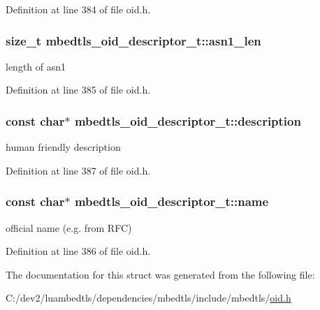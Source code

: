 Definition at line 384 of file oid.\-h.

\hypertarget{structmbedtls__oid__descriptor__t_a99525f8a87473843e282f79ee07e5f9f}{
\subsubsection[{asn1\-\_\-len}]{\setlength{\rightskip}{0pt plus 5cm}size\-\_\-t mbedtls\-\_\-oid\-\_\-descriptor\-\_\-t\-::asn1\-\_\-len}}\label{structmbedtls__oid__descriptor__t_a99525f8a87473843e282f79ee07e5f9f}
length of asn1 

Definition at line 385 of file oid.\-h.

\hypertarget{structmbedtls__oid__descriptor__t_a5b447674c65045cf4f855bd1c728f109}{
\subsubsection[{description}]{\setlength{\rightskip}{0pt plus 5cm}const char$\ast$ mbedtls\-\_\-oid\-\_\-descriptor\-\_\-t\-::description}}\label{structmbedtls__oid__descriptor__t_a5b447674c65045cf4f855bd1c728f109}
human friendly description 

Definition at line 387 of file oid.\-h.

\hypertarget{structmbedtls__oid__descriptor__t_a096eb054c65a0735f77c3431097c2aa4}{
\subsubsection[{name}]{\setlength{\rightskip}{0pt plus 5cm}const char$\ast$ mbedtls\-\_\-oid\-\_\-descriptor\-\_\-t\-::name}}\label{structmbedtls__oid__descriptor__t_a096eb054c65a0735f77c3431097c2aa4}
official name (e.\-g. from R\-F\-C) 

Definition at line 386 of file oid.\-h.



The documentation for this struct was generated from the following file\-:\begin{DoxyCompactItemize}
\item 
C\-:/dev2/luambedtls/dependencies/mbedtls/include/mbedtls/\hyperlink{oid_8h}{oid.\-h}\end{DoxyCompactItemize}
